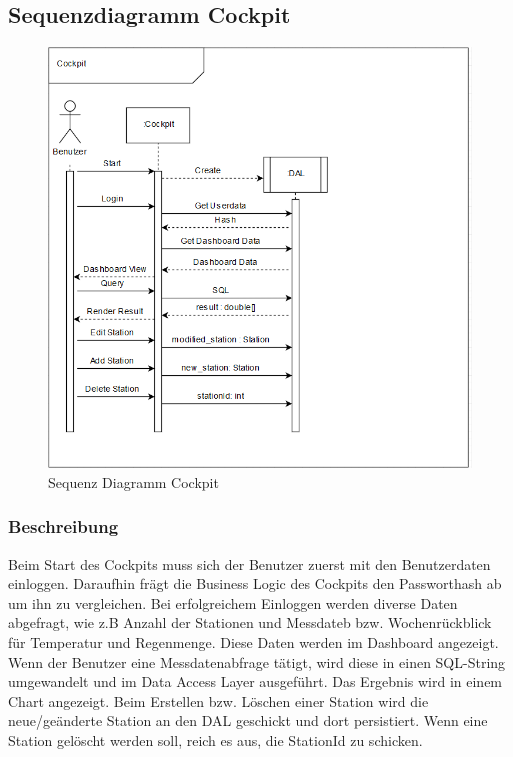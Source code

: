 \newpage

\subsection{Sequenzdiagramm Cockpit}


\begin{figure}[H]
\centering
\includegraphics[scale=1.2]{pictures/sequence/Sequence_cockpit_full.png}
\caption{Sequenz Diagramm Cockpit}
\label{fig:Wetr.Cockpit.Wpf-sequence}
\end{figure}
\raggedright

\subsubsection{Beschreibung}

Beim Start des Cockpits muss sich der Benutzer zuerst mit den Benutzerdaten einloggen. Daraufhin frägt die Business Logic des Cockpits den Passworthash ab um ihn zu vergleichen. Bei erfolgreichem Einloggen werden diverse Daten abgefragt, wie z.B Anzahl der Stationen und Messdateb bzw. Wochenrückblick für Temperatur und Regenmenge. Diese Daten werden im Dashboard angezeigt. Wenn der Benutzer eine Messdatenabfrage tätigt, wird diese in einen SQL-String umgewandelt und im Data Access Layer ausgeführt. Das Ergebnis wird in einem Chart angezeigt. Beim Erstellen bzw. Löschen einer Station wird die neue/geänderte Station an den DAL geschickt und dort persistiert. Wenn eine Station gelöscht werden soll, reich es aus, die StationId zu schicken.
